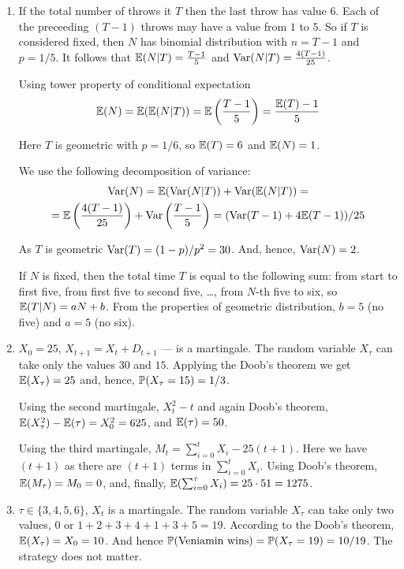 \documentclass[pdftex,12pt,a4paper]{article}
\begin{document}
\begin{enumerate}
\item If the total number of throws it $T$ then the last throw has value $6$. Each of the preceeding $(T-1)$ throws may have a value from $1$ to $5$. So if $T$ is considered fixed, then $N$ has binomial distribution with $n=T-1$ and $p=1/5$. It follows that $\E(N|T)=\frac{T-1}{5}$ and $\Var(N|T)=\frac{4(T-1)}{25}$.

Using tower property of conditional expectation
\[
\E(N)=\E(\E(N|T))=\E\left( \frac{T-1}{5} \right)=\frac{\E(T)-1}{5}
\]

Here $T$ is geometric with $p=1/6$, so $\E(T)=6$ and $\E(N)=1$.

We use the following decomposition of variance:
\begin{multline}
\Var(N)=\E(\Var(N|T))+\Var(\E(N|T))=\\
=\E\left(\frac{4(T-1)}{25}\right)+\Var\left(\frac{T-1}{5}\right)=(\Var(T-1)+4\E(T-1))/25
\end{multline}

As $T$ is geometric $\Var(T)=(1-p)/p^2=30$. And, hence, $\Var(N)=2$.

If $N$ is fixed, then the total time $T$ is equal to the following sum: from start to first five, from first five to second five, \ldots, from $N$-th five to six, so $\E(T|N)=aN+b$. From the properties of geometric distribution, $b=5$ (no five) and $a=5$ (no six).

\item $X_0=25$, $X_{t+1}=X_t + D_{t+1}$ --- is a martingale. The random variable $X_{\tau}$ can take only the values $30$ and $15$. Applying the Doob's theorem we get $\E(X_{\tau})=25$ and, hence, $\P(X_{\tau}=15)=1/3$. 

Using the second martingale, $X^2_t-t$ and again Doob's theorem, $\E(X^2_{\tau})-\E(\tau)=X_0^2=625$, and $\E(\tau)=50$.

Using the third martingale, $M_t=\sum_{i=0}^t X_i - 25(t+1)$. Here we have $(t+1)$ as there are $(t+1)$ terms in $\sum_{i=0}^t X_i$. Using Doob's theorem, $\E(M_{\tau})=M_0=0$, and, finally, $\E(\sum_{i=0}^{\tau} X_i )=25\cdot 51=1275$.

\item $\tau \in \{3,4,5,6\}$, $X_t$ is a martingale. The random variable $X_{\tau}$ can take only two values, $0$ or $1+2+3+4+1+3+5=19$. According to the Doob's theorem, $\E(X_{\tau})=X_0=10$. And hence $\P(\text{Veniamin wins})=\P(X_{\tau}=19)=10/19$. The strategy does not matter.


\end{enumerate}
\end{document}
